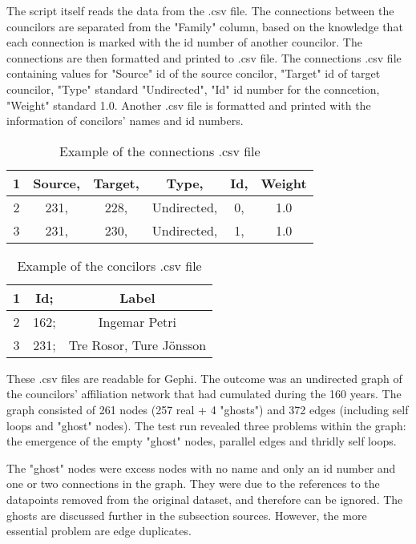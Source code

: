 \documentclass[a4paper,12pt]{article}
\begin{document}
The script itself reads the data from the .csv file. The connections between the councilors are separated from the "Family" column, based on the knowledge that each connection is marked with the id number of another councilor. The connections are then formatted and printed to .csv file. The connections .csv file containing values for "Source" id of the source concilor, "Target" id of target councilor, "Type" standard "Undirected", "Id" id number for the conncetion, "Weight" standard 1.0. Another .csv file is formatted and printed with the information of concilors' names and id numbers.

\begin{table}[h]
	\caption{Example of the connections .csv file}
	\centering
	\begin{tabular}{cccccc}
		\hline
		1 &Source, &Target, &Type, &Id, &Weight \\
		\hline
		2 &231, &228, &Undirected, &0, &1.0 \\
		\hline
		3 &231, &230, &Undirected, &1, &1.0 \\
		\hline
	\end{tabular}
\end{table}
\begin{table}[h]
	\caption{Example of the concilors .csv file}
	\centering
	\begin{tabular}{ccc}	
		\hline
		1 &Id; &Label \\
		\hline
		2 &162; &Ingemar Petri \\
		\hline
		3 &231; &Tre Rosor, Ture Jönsson \\
		\hline
	\end{tabular}
\end{table}

These .csv files are readable for Gephi. The outcome was an undirected graph of the councilors' affiliation network that had cumulated during the 160 years. The graph consisted of 261 nodes (257 real + 4 "ghosts") and 372 edges (including self loops and "ghost" nodes). The test run revealed three problems within the graph: the emergence of the empty "ghost" nodes, parallel edges and thridly self loops. 

The "ghost" nodes were excess nodes with no name and only an id number and one or two connections in the graph. They were due to the references to the datapoints removed from the original dataset, and therefore can be ignored. The ghosts are discussed further in the subsection sources. However, the more essential problem are edge duplicates.
\end{document}
